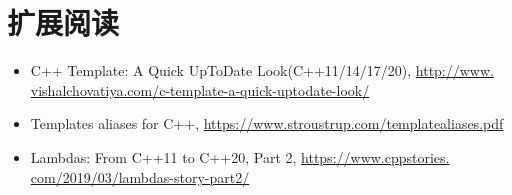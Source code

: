 \section{扩展阅读}
\begin{itemize}
\item
C++ Template: A Quick UpToDate Look(C++11/14/17/20), \url{http://www.
vishalchovatiya.com/c-template-a-quick-uptodate-look/}

\item
Templates aliases for C++, \url{https://www.stroustrup.com/templatealiases.pdf}

\item
Lambdas: From C++11 to C++20, Part 2, \url{https://www.cppstories.
com/2019/03/lambdas-story-part2/}
\end{itemize}